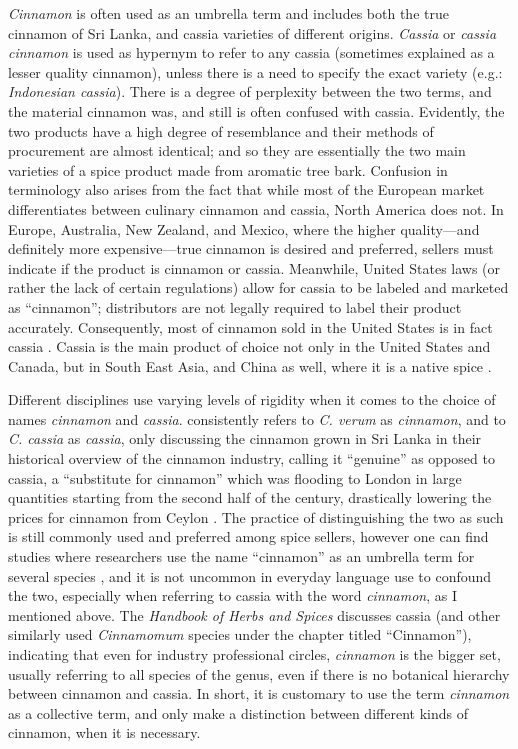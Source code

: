 \textit{Cinnamon} is often used as an umbrella term and includes both the true cinnamon of Sri Lanka, and cassia varieties of different origins. \textit{Cassia} or \textit{cassia cinnamon} is used as hypernym to refer to any cassia (sometimes explained as a lesser quality cinnamon), unless there is a need to specify the exact variety (e.g.: \textit{Indonesian cassia}). There is a degree of perplexity between the two terms, and the material cinnamon was, and still is often confused with cassia. Evidently, the two products have a high degree of resemblance and their methods of procurement are almost identical; and so they are essentially the two main varieties of a spice product made from aromatic tree bark. Confusion in terminology also arises from the fact that while most of the European market differentiates between culinary cinnamon and cassia, North America does not. In Europe, Australia, New Zealand, and Mexico, where the higher quality---and definitely more expensive---true cinnamon is desired and preferred, sellers must indicate if the product is cinnamon or cassia. Meanwhile, United States laws (or rather the lack of certain regulations) allow for cassia to be labeled and marketed as ``cinnamon''; distributors are not legally required to label their product accurately. Consequently, most of cinnamon sold in the United States is in fact cassia \autocite[124]{czarra_spices_2009}. Cassia is the main product of choice not only in the United States and Canada, but in South East Asia, and China as well, where it is a native spice \parencite[104]{van_wyk_culinary_2014}.

Different disciplines use varying levels of rigidity when it comes to the choice of names \textit{cinnamon} and \textit{cassia}. \textcite{wijesekera_chemistry_1978} consistently refers to \textit{C. verum} as \textit{cinnamon}, and to \textit{C. cassia} as \textit{cassia}, only discussing the cinnamon grown in Sri Lanka in their historical overview of the cinnamon industry, calling it ``genuine'' as opposed to cassia, a ``substitute for cinnamon'' which was flooding to London in large quantities starting from the second half of the  century, drastically lowering the prices for cinnamon from Ceylon \parencite{wijesekera_chemistry_1978}. The practice of distinguishing the two as such is still commonly used and preferred among spice sellers, however one can find studies where researchers use the name ``cinnamon'' as an umbrella term for several species \parencite[see][]{rao_cinnamon_2014}, and it is not uncommon in everyday language use to confound the two, especially when referring to cassia with the word \textit{cinnamon}, as I mentioned above. The \textit{Handbook of Herbs and Spices} \parencite{peter_handbook_2012} discusses cassia (and other similarly used \textit{Cinnamomum} species under the chapter titled ``Cinnamon''), indicating that even for industry professional circles, \textit{cinnamon} is the bigger set, usually referring to all species of the genus, even if there is no botanical hierarchy between cinnamon and cassia. In short, it is customary to use the term \textit{cinnamon} as a collective term, and only make a distinction between different kinds of cinnamon, when it is necessary. 

